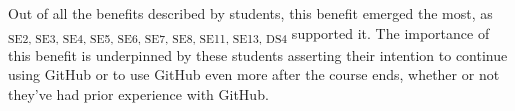 Out of all the benefits described by students, this benefit emerged the most, as \textsubscript{SE2, SE3, SE4, SE5, SE6, SE7, SE8, SE11, SE13, DS4} supported it. The importance of this benefit is underpinned by these students asserting their intention to continue using GitHub or to use GitHub even more after the course ends, whether or not they've had prior experience with GitHub.





